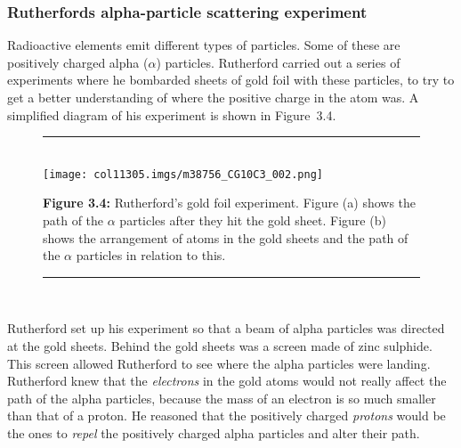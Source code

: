             \subsubsection{ Rutherfords alpha-particle scattering experiment}
            \nopagebreak
            \label{m38756*id254668}Radioactive elements emit different types of particles. Some of these are positively charged alpha ($\alpha $) particles.
Rutherford carried out a series of experiments where he bombarded sheets of gold foil with these particles, to try to get a better understanding of where the positive charge in the atom was. A simplified diagram of his experiment is shown in Figure~3.4.\par 
    \setcounter{subfigure}{0}
	\begin{figure}[H] %
    \begin{center}
    \rule[.1in]{\figurerulewidth}{.005in} \\
        \label{m38756*uid4!!!underscore!!!media}\label{m38756*uid4!!!underscore!!!printimage}\texttt{[image: col11305.imgs/m38756\_CG10C3\_002.png]} %
      \vspace{2pt}
    \vspace{\rubberspace}\par \begin{cnxcaption}
	  \small \textbf{Figure 3.4: }Rutherford's gold foil experiment. Figure (a) shows the path of the $\alpha $ particles after they hit the gold sheet. Figure (b) shows the arrangement of atoms in the gold sheets and the path of the $\alpha $ particles in relation to this.
	\end{cnxcaption}
    \vspace{.1in}
    \rule[.1in]{\figurerulewidth}{.005in} \\
    \end{center}
 \end{figure}       
        \label{m38756*id254715}Rutherford set up his experiment so that a beam of alpha particles was directed at the gold sheets. Behind the gold sheets was a screen made of zinc sulphide. This screen allowed Rutherford to see where the alpha particles were landing. Rutherford knew that the \textsl{electrons} in the gold atoms would not really affect the path of the alpha particles, because the mass of an electron is so much smaller than that of a proton. He reasoned that the positively charged \textsl{protons} would be the ones to \textsl{repel} the positively charged alpha particles and alter their path.\par 
